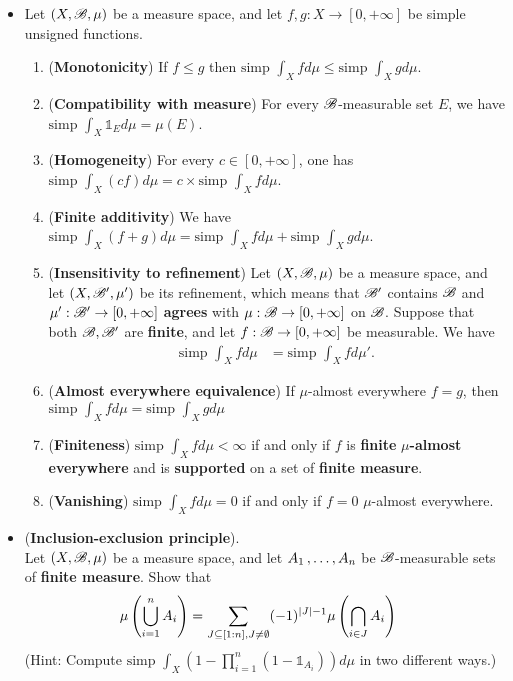 \documentclass[11pt]{article}
\begin{document}
\begin{itemize}
\item \begin{proposition}
Let  $(X, {\mathscr B}, \mu)$ be a measure space, and let $f, g: X \rightarrow [0, +\infty]$  be simple unsigned functions.
\begin{enumerate}
\item (\textbf{Monotonicity}) If $f \le g$  then $\text{simp }\int_X f d\mu \le \text{simp }\int_X g d\mu$.
\item (\textbf{Compatibility with measure}) For every ${\mathscr B}$-measurable set $E$, we have $\text{simp }\int_X \mathds{1}_{E} d\mu = \mu(E)$.
\item (\textbf{Homogeneity}) For every $c \in [0, +\infty]$,  one has $\text{simp }\int_X (cf) d\mu = c\times \text{simp }\int_X f d\mu  $.
\item (\textbf{Finite additivity}) We have $\text{simp }\int_X (f + g)d\mu = \text{simp }\int_X f d\mu + \text{simp }\int_X g d\mu$.
\item (\textbf{Insensitivity to refinement}) Let $(X, {\mathscr B}, \mu)$ be a measure space, and let $(X, {\mathscr B}', \mu')$ be its refinement, which means that ${\mathscr B}'$ contains ${\mathscr B}$ and $\mu': {\mathscr B}' \rightarrow [0, +\infty]$ \textbf{agrees} with $\mu: {\mathscr B} \rightarrow [0, +\infty]$ on ${\mathscr B}$. Suppose that both ${\mathscr B}, {\mathscr B}'$ are \textbf{finite}, and let $f: {\mathscr B} \rightarrow [0, +\infty]$ be measurable. We have
\begin{align*}
\text{simp }\int_{X} f d\mu &= \text{simp }\int_{X} f d\mu'.
\end{align*}
\item (\textbf{Almost everywhere equivalence}) If $\mu$-almost everywhere $f =g$, then  $\text{simp }\int_X f d\mu =  \text{simp }\int_X g d\mu$
\item (\textbf{Finiteness}) $\text{simp }\int_X f d\mu < \infty$  if and only if $f$  is \textbf{finite} \textbf{$\mu$-almost everywhere} and is \textbf{supported} on a set of \textbf{finite measure}.
\item (\textbf{Vanishing}) $\text{simp }\int_X f d\mu  = 0$  if and only if $f = 0$ $\mu$-almost everywhere.
\end{enumerate}
\end{proposition}

\item \begin{exercise}(\textbf{Inclusion-exclusion principle}).\\
 Let $(X, {\mathscr B}, \mu)$ be a measure space, and let $A_1 \,{,}\ldots{,}\, A_n$ be ${\mathscr B}$-measurable sets of \textbf{finite measure}. Show that
 \begin{align*}
\mu\left(\bigcup_{i=1}^{n}A_i\right) &= \sum_{J \subseteq [1:n], J \neq \emptyset}(-1)^{\left\lvert J \right\rvert-1}\mu\left(\bigcap_{i\in J}A_i\right)
 \end{align*}
(Hint: Compute $\text{simp }\int_{X}(1 - \prod_{i=1}^{n}(1- \mathds{1}_{A_i})) d\mu$ in two different ways.)
\end{exercise}


\end{itemize}
\end{document}
